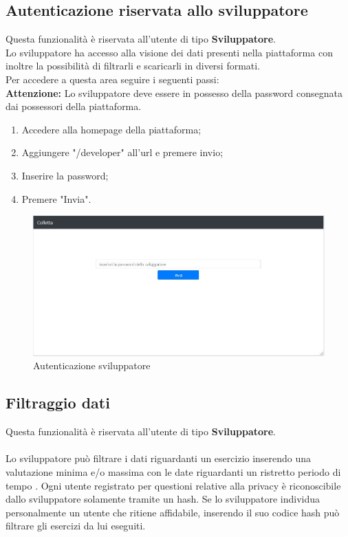 \documentclass[11pt,a4paper]{article}
\begin{document}
{	\newpage

	\subsection{Autenticazione riservata allo sviluppatore}
		Questa funzionalità è riservata all'utente di tipo \textbf{Sviluppatore}.\\
		
	\noindent	Lo sviluppatore ha accesso alla visione dei dati presenti nella piattaforma con inoltre la possibilità di filtrarli e scaricarli in diversi formati.\\ Per accedere a questa area seguire i seguenti passi:\\
		
	\noindent	\textbf{Attenzione:} Lo sviluppatore deve essere in possesso della password consegnata dai possessori della piattaforma.
		
		\begin{enumerate}
			\item Accedere alla homepage della piattaforma;
			\item Aggiungere "/developer" all'url e premere invio;
			\item Inserire la password;
			\item Premere "Invia".
		\end{enumerate}
	
	\begin{figure}[h]
		\centering
		\includegraphics[scale=0.65]{images/homesviluppatore.jpg}
		\caption{Autenticazione sviluppatore}
	\end{figure}

	\newpage
	\subsection{Filtraggio dati}
		Questa funzionalità è riservata all'utente di tipo \textbf{Sviluppatore}.
		\\ \\
		Lo sviluppatore può filtrare i dati riguardanti un esercizio inserendo una valutazione minima e/o massima con le date riguardanti un ristretto periodo di tempo . Ogni utente registrato per questioni relative alla privacy è riconoscibile dallo sviluppatore solamente tramite un hash. Se lo sviluppatore individua personalmente un utente che ritiene affidabile, inserendo il suo codice hash può filtrare gli esercizi da lui eseguiti.
		
}
\end{document}

